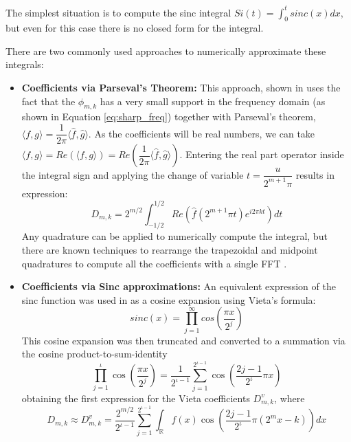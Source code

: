 \documentclass[12,twoside]{mammeTFM}
\theoremstyle{definition}
\theoremstyle{remark}
\begin{document}
The simplest situation is to compute the sinc integral $Si(t) = \int_0^t{sinc(x) dx}$, but even for this case there is no closed form for the integral. 

There are two commonly used approaches to numerically approximate these integrals:
\begin{itemize}
\item{ \textbf{Coefficients via Parseval's Theorem: } This approach, shown in \cite{Ortiz-Gracia2016} uses the fact that the $\phi_{m,k}$ has a very small support in the frequency domain (as shown in Equation \ref{eq:sharp_freq}) together with Parseval's theorem, 
$\langle f, g \rangle = \dfrac{1}{2 \pi}\langle \hat{f}, \hat{g} \rangle$. As the coefficients will be real numbers, we can take $\langle f, g \rangle = Re \left( \langle f, g \rangle \right) = Re \left( \dfrac{1}{2 \pi}\langle \hat{f}, \hat{g} \rangle \right)$. Entering the real part operator inside the integral sign and applying the change of variable $t = \dfrac{u}{2^{m+1} \pi}$ results in expression:
\begin{equation}
D_{m,k} = 2^{m/2} \int_{-1/2}^{1/2} Re \left(\hat{f}(2^{m+1} \pi t) e^{i2\pi k t} \right) dt
\end{equation} 
Any quadrature can be applied to numerically compute the integral, but there are known techniques to rearrange the trapezoidal and midpoint quadratures to compute all the coefficients with a single FFT \cite{mar17, flo20}.
}
\item { \textbf{Coefficients via Sinc approximations: }
An equivalent expression of the sinc function was used in \cite{Ortiz-Gracia2016} as a cosine expansion using Vieta's formula: 
\begin{equation}
sinc(x) = \prod_{j = 1}^{\infty} cos \left( \dfrac{\pi x}{2^j} \right)
\end{equation}
This cosine expansion was then truncated and converted to a summation via the cosine product-to-sum-identity
\begin{equation} \label{eq:density_v}
\prod_{j=1}^{\iota} \cos \left(\frac{\pi x}{2^{j}}\right)=\frac{1}{2^{\iota-1}} \sum_{j=1}^{2^{\iota-1}} \cos \left(\frac{2 j-1}{2^{\iota}} \pi x\right)
\end{equation}
obtaining the first expression for the Vieta coefficients $D_{m,k}^v$, where
\begin{equation}
D_{m,k} \approx D_{m,k}^{v}= \frac{2^{m / 2}}{2^{\iota-1}} \sum_{j=1}^{2^{\iota-1}} \int_{\mathbb{R}} f(x) \cos \left(\frac{2 j-1}{2^{\iota}} \pi\left(2^{m} x-k\right)\right) d x
\end{equation} \label{eq:density_vc}
}
\end{itemize}
\end{document}
